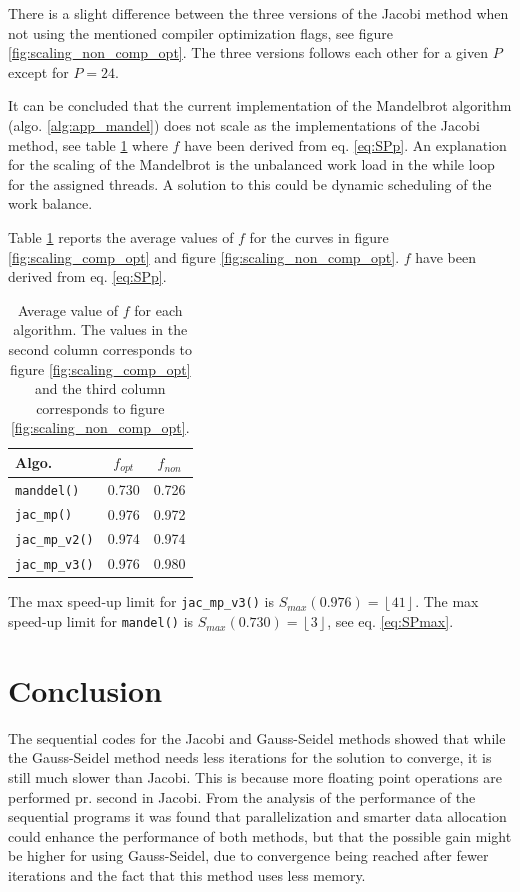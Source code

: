 There is a slight difference between the three versions of the Jacobi method when not using the mentioned compiler optimization flags, see figure \ref{fig:scaling_non_comp_opt}. The three versions follows each other for a given $P$ except for $P=24$.

It can be concluded that the current implementation of the Mandelbrot algorithm (algo. \ref{alg:app_mandel}) does not scale as the implementations of the Jacobi method, see table \ref{tab:avergae_f} where $f$ have been derived from eq. \ref{eq:SPp}.
An explanation for the scaling of the Mandelbrot is the unbalanced work load in the while loop for the assigned threads. A solution to this could be dynamic scheduling of the work balance.

Table \ref{tab:avergae_f} reports the average values of $f$ for the curves in figure \ref{fig:scaling_comp_opt} and figure \ref{fig:scaling_non_comp_opt}. $f$ have been derived from eq. \ref{eq:SPp}.

\begin{table}[H]
\centering
\begin{tabular}{l|cc}
Algo. & $f_{opt}$ & $f_{non}$  \\\hline
\texttt{manddel()} & 0.730 & 0.726\\
\texttt{jac\_mp()} & 0.976 & 0.972\\
\texttt{jac\_mp\_v2()} & 0.974 & 0.974\\
\texttt{jac\_mp\_v3()} & 0.976 & 0.980\\
\end{tabular}
\caption{Average value of $f$ for each algorithm. The values in the second column corresponds to figure \ref{fig:scaling_comp_opt} and the third column corresponds to figure \ref{fig:scaling_non_comp_opt}. }
\label{tab:avergae_f}
\end{table}
The max speed-up limit for \texttt{jac\_mp\_v3()} is $S_{max}(0.976)=\left\lfloor  41 \right\rfloor$. The max speed-up limit for \texttt{mandel()} is $S_{max}(0.730)=\left\lfloor  3\right\rfloor$, see eq. \ref{eq:SPmax}.


\section{Conclusion}
The sequential codes for the Jacobi and Gauss-Seidel methods showed that while the Gauss-Seidel method needs less iterations for the solution to converge, it is still much slower than Jacobi. This is because more floating point operations are performed pr. second in Jacobi. From the analysis of the performance of the sequential programs it was found that parallelization and smarter data allocation could enhance the performance of both methods, but that the possible gain might be higher for using Gauss-Seidel, due to convergence being reached after fewer iterations and the fact that this method uses less memory. 


